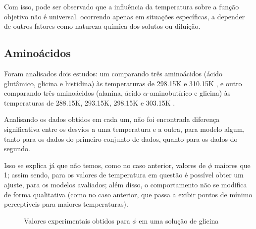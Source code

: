 \documentclass[
	12pt,				%
	openright,
	twoside,
	a4paper,			%
	brazil,			%
	french,				%
	spanish,			%
	english				%
	]{abntex2}
\begin{document}
Com isso, pode ser observado que a influência da temperatura sobre a função
objetivo não é universal. ocorrendo apenas em situações específicas, a
depender de outros fatores como natureza química dos solutos ou diluição.

\subsection{Aminoácidos}

Foram analisados dois estudos: um comparando três aminoácidos (ácido glutâmico,
glicina e histidina) às temperaturas de 298.15K e 310.15K \cite{tsurko2007}, e
outro comparando três aminoácidos (alanina, ácido $\alpha$-aminobutírico e glicina)
às temperaturas de 288.15K, 293.15K, 298.15K e 303.15K \cite{romero2006}.

Analisando os dados obtidos em cada um, não foi encontrada diferença significativa
entre os desvios a uma temperatura e a outra, para modelo algum, tanto para os
dados do primeiro conjunto de dados, quanto para os dados do segundo.

Isso se explica já que não temos, como no caso anterior, valores de $\phi$ maiores
que 1; assim sendo, para os valores de temperatura em questão é possível obter
um ajuste, para os modelos avaliados; além disso, o comportamento não se modifica
de forma qualitativa (como no caso anterior, que passa a exibir pontos de mínimo
perceptíveis para maiores temperaturas).

\begin{figure}[h]
	\centering
	\caption{Valores experimentais obtidos para $\phi$ em uma solução de glicina}
	\label{fig_temp_amins}
\end{figure}
\end{document}
